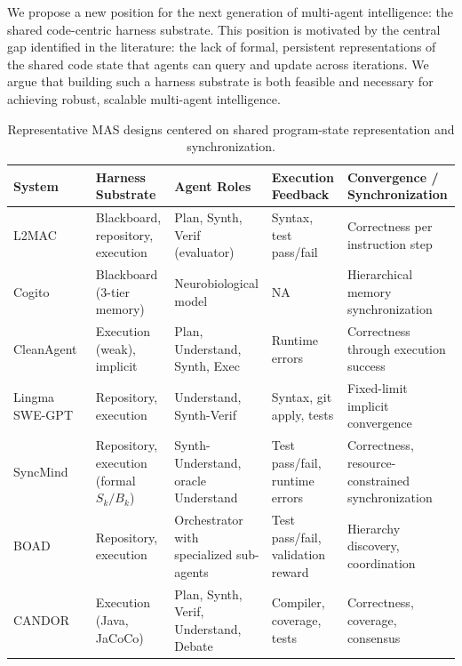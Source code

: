 We propose a new position for the next generation of multi-agent
intelligence: the shared code-centric harness substrate. This
position is motivated by the central gap identified in the
literature: the lack of formal, persistent representations of the
shared code state that agents can query and update across
iterations. We argue that building such a harness substrate is
both feasible and necessary for achieving robust, scalable
multi-agent intelligence.



\begin{table}[t]
\centering
\caption{Representative MAS designs centered on shared program-state representation and synchronization.}
\label{tab:mas_world_state_systems}
\renewcommand{\arraystretch}{1.16}
\setlength{\tabcolsep}{4pt}
\footnotesize
\begin{tabularx}{\textwidth}{@{}
  >{\raggedright\arraybackslash}p{2.55cm}
  >{\raggedright\arraybackslash}p{3.05cm}
  >{\raggedright\arraybackslash}p{3.15cm}
  >{\raggedright\arraybackslash}p{3.05cm}
  >{\raggedright\arraybackslash}X@{}}
\toprule
\textbf{System}
& \textbf{Harness Substrate}
& \textbf{Agent Roles}
& \textbf{Execution Feedback}
& \textbf{Convergence / Synchronization} \\
\midrule
L2MAC~\cite{Holt2023L2MAC}
& Blackboard, repository, execution
& Plan, Synth, Verif (evaluator)
& Syntax, test pass/fail
& Correctness per instruction step \\ \midrule
Cogito~\cite{Li2025Cogito}
& Blackboard (3-tier memory)
& Neurobiological model
& NA
& Hierarchical memory synchronization \\ \midrule
CleanAgent~\cite{Qi2024CleanAgent}
& Execution (weak), implicit
& Plan, Understand, Synth, Exec
& Runtime errors
& Correctness through execution success \\ \midrule
Lingma SWE-GPT~\cite{Ma2024Lingma}
& Repository, execution
& Understand, Synth-Verif
& Syntax, git apply, tests
& Fixed-limit implicit convergence \\ \midrule
SyncMind~\cite{Guo2025SyncMind}
& Repository, execution (formal $S_k/B_k$)
& Synth-Understand, oracle Understand
& Test pass/fail, runtime errors
& Correctness, resource-constrained synchronization \\ \midrule
BOAD~\cite{xu2025boad}
& Repository, execution
& Orchestrator with specialized sub-agents
& Test pass/fail, validation reward
& Hierarchy discovery, coordination \\ \midrule
CANDOR~\cite{Xu2025Hallucination}
& Execution (Java, JaCoCo)
& Plan, Synth, Verif, Understand, Debate
& Compiler, coverage, tests
& Correctness, coverage, consensus \\
\bottomrule
\end{tabularx}
\end{table}


